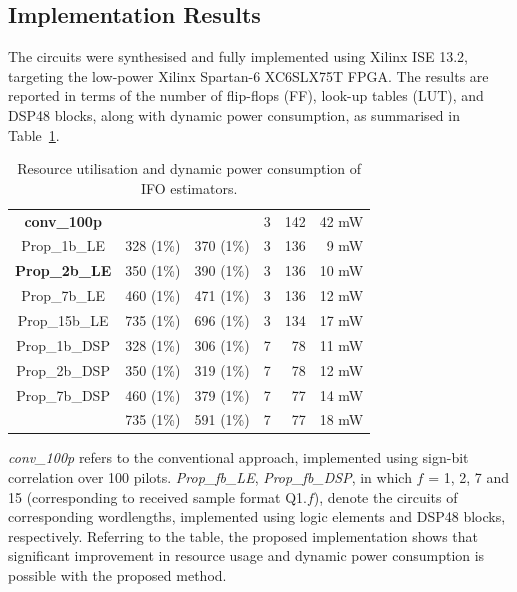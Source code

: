 \subsection{Implementation Results}
The circuits were synthesised and fully implemented using Xilinx ISE 13.2, targeting the low-power Xilinx Spartan-6 XC6SLX75T FPGA.
The results are reported in terms of the number of flip-flops (FF), look-up tables (LUT), and DSP48 blocks, along with dynamic power consumption, as summarised in Table~\ref{tab:Imp_Rpt}.
\begin{table}[h]
	\centering
	\caption{Resource utilisation and dynamic power consumption of IFO estimators.}
	\label{tab:Imp_Rpt}
	\renewcommand{\arraystretch}{1.2}

	\begin{tabular}{c|r|r|r|r|r}

       \hline \hline
    		  \makebox[1.1cm][c]{IFO est. Cir.} 	& \makebox[1 cm][c]{\#FF} & \makebox[1cm][c]{\#LUT}  & \makebox[0.4cm][c]{\#DSP} & \makebox[1cm][c]{Fre (MHz)} & \makebox[0.9cm][c]{D. Power} \\
    	\hline
		\textbf{conv\_100p}		&\makebox[1 cm][r]{ 3270 (3\%)}	& \makebox[1 cm][r]{ 1837 (3\%)}	& 3 &  142 	&  42	mW \\
		Prop\_1b\_LE			& 328 (1\%)		& 370 (1\%)		& 3 &  136 	&  9	mW\\
		\textbf{Prop\_2b\_LE}	& 350 (1\%)		& 390 (1\%)		& 3 &  136 	&  10 	mW\\
		Prop\_7b\_LE			& 460 (1\%)		& 471 (1\%)		& 3 &  136 	&  12 	mW\\
		Prop\_15b\_LE		      & 735 (1\%)		& 696 (1\%)		& 3 &  134 	&  17 	mW\\

		Prop\_1b\_DSP			& 328 (1\%)		& 306 (1\%)		& 7 &  78   	&  11 	mW\\
		Prop\_2b\_DSP			& 350 (1\%)		& 319 (1\%)		& 7 &  78   	&  12	mW\\
		Prop\_7b\_DSP			& 460 (1\%)		& 379 (1\%)		& 7 &  77   	&  14	mW\\
		\makebox[1.1cm][c]{Prop\_15b\_DSP}	& 735 (1\%)		& 591 (1\%)		& 7 &  77 	&  18 	mW\\
    	\hline \hline
    \end{tabular}
\end{table}

\emph{conv\_100p} refers to the conventional approach, implemented using sign-bit correlation over 100 pilots.
\emph{Prop\_fb\_LE}, \emph{Prop\_fb\_DSP}, in which $f$ = 1, 2, 7 and 15 (corresponding to received sample format Q1.$f$), denote the circuits of corresponding wordlengths, implemented using logic elements and DSP48 blocks, respectively.
Referring to the table, the proposed implementation shows that significant improvement in resource usage and dynamic power consumption is possible with the proposed method.

